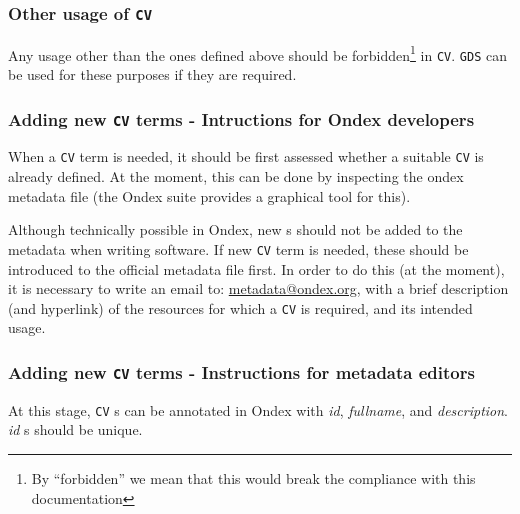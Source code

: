 \documentclass[a4paper,10pt]{article}
\newcommand{\field}[1]{\textit{#1}\xspace}
\newcommand{\term}[1]{\texttt{#1}\xspace}
\begin{document}
\subsubsection{Other usage of \term{CV}}

Any usage other than the ones defined above should be forbidden\footnote{By ``forbidden'' we mean that this would break the compliance with this documentation} in \term{CV}.
\term{GDS} can be used for these purposes if they are required.




\subsubsection{Adding new \term{CV} terms - Intructions for Ondex developers}

When a \term{CV} term is needed, it should be first assessed whether a
suitable \term{CV} is already defined. At the moment, this can be done by
inspecting the ondex metadata file (the Ondex suite provides a graphical tool for this).

Although technically possible in Ondex, new \cv{}s should not be added to the
metadata when writing software. If new \term{CV} term is needed, these should
be introduced to the official metadata file first. In order to do this (at the
moment), it is necessary to write an email to: \url{metadata@ondex.org}, with
a brief description (and hyperlink) of the resources for which a \term{CV} is
required, and its intended usage.


\subsubsection{Adding new \term{CV} terms - Instructions for metadata editors}

At this stage, \term{CV}s can be annotated in Ondex with
\field{id}, \field{fullname}, and \field{description}. \field{id}s should
be unique.
\end{document}
